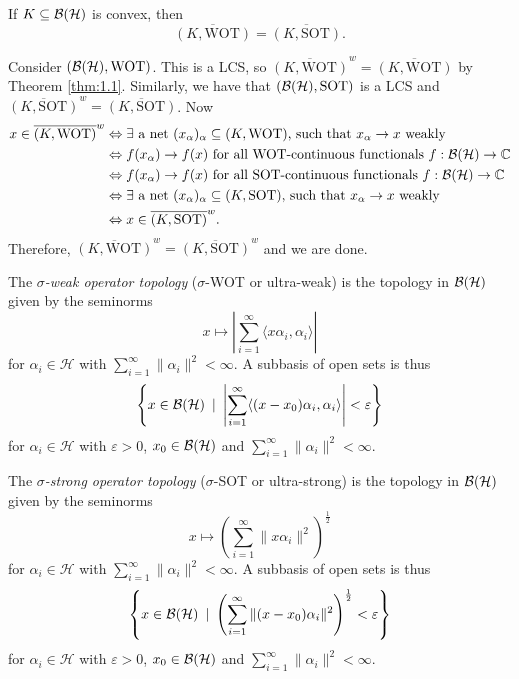 \begin{corollary}
  If $K \subseteq \operatorname{\mathcal{B} (\mathcal{H})}$ is convex, then 
  $$\overline{(K, \textrm{WOT})} = \overline{(K, \textrm{SOT})}.$$
\end{corollary}

\begin{myproof}
  Consider $(\operatorname{\mathcal{B} (\mathcal{H})}, \textrm{WOT})$. This is a LCS, so $\overline{(K, \textrm{WOT})}^w = \overline{(K, \textrm{WOT})}$ 
  by Theorem \ref{thm:1.1}. Similarly, we have that $(\operatorname{\mathcal{B} (\mathcal{H})}, \textrm{SOT})$ is a LCS and $\overline{(K, \textrm{SOT})}^w = \overline{(K, \textrm{SOT})}$.
  Now 
  \begin{align*}
    x \in \overline{(K, \textrm{WOT})}^w &\Leftrightarrow \textrm{$\exists$ a net $(x_\alpha)_\alpha \subseteq (K, \textrm{WOT})$, such that $x_\alpha \to x$ weakly}\\
    &\Leftrightarrow \textrm{$f(x_\alpha) \to f(x)$ for all WOT-continuous functionals $f: \operatorname{\mathcal{B} (\mathcal{H})} \to \mathbb {C}$}\\
    &\Leftrightarrow \textrm{$f(x_\alpha) \to f(x)$ for all SOT-continuous functionals $f: \operatorname{\mathcal{B} (\mathcal{H})} \to \mathbb {C}$}\\
    &\Leftrightarrow \textrm{$\exists$ a net $(x_\alpha)_\alpha \subseteq (K, \textrm{SOT})$, such that $x_\alpha \to x$ weakly}\\
    &\Leftrightarrow x \in \overline{(K, \textrm{SOT})}^w. 
  \end{align*}
  Therefore, $\overline{(K, \textrm{WOT})}^w = \overline{(K, \textrm{SOT})}^w$ and we are done.
\end{myproof}

\begin{definition}
  The \emph{$\sigma$-weak operator topology} ($\sigma$-WOT or ultra-weak) is the topology in $\operatorname{\mathcal{B} (\mathcal{H})}$
  given by the seminorms $$x \mapsto \left| \sum_{i = 1} ^\infty \langle x \alpha_i, \alpha_i \rangle\right| $$
  for $\alpha_i \in \mathcal{H}$ with $\sum_{i = 1} ^\infty \| \alpha_i \|^2 < \infty$.
  A subbasis of open sets is thus 
  $$\left\lbrace x \in \operatorname{\mathcal{B} (\mathcal{H})}\ |\ \left| \sum_{i = 1} ^\infty \langle (x - x_0) \alpha_i, \alpha_i \rangle \right| < \varepsilon \right\rbrace$$
  for $\alpha_i \in \mathcal{H}$ with $\varepsilon > 0$, $x_0 \in \operatorname{\mathcal{B} (\mathcal{H})}$ and $\sum_{i = 1} ^\infty \| \alpha_i\|^2 < \infty$.
\end{definition}

\begin{definition}
  The \emph{$\sigma$-strong operator topology} ($\sigma$-SOT or ultra-strong) is the topology in $\operatorname{\mathcal{B} (\mathcal{H})}$
  given by the seminorms $$x \mapsto \left( \sum_{i = 1} ^\infty \| x \alpha_i \|^2\right)^{\frac{1}{2}}$$
  for $\alpha_i \in \mathcal{H}$ with $\sum_{i = 1} ^\infty \| \alpha_i \|^2 < \infty$.
  A subbasis of open sets is thus 
  $$\left\lbrace x \in \operatorname{\mathcal{B} (\mathcal{H})}\ |\ \left( \sum_{i = 1} ^\infty \| (x - x_0) \alpha_i\|^2 \right)^{\frac{1}{2}} < \varepsilon \right\rbrace$$
  for $\alpha_i \in \mathcal{H}$ with $\varepsilon > 0$, $x_0 \in \operatorname{\mathcal{B} (\mathcal{H})}$ and $\sum_{i = 1} ^\infty \| \alpha_i\|^2 < \infty$.
\end{definition}

